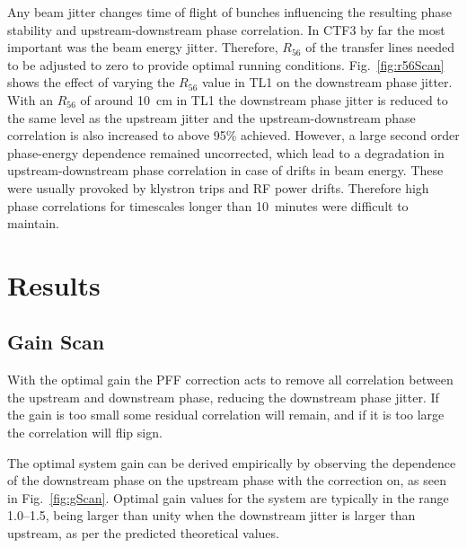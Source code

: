 \documentclass[%
 reprint,
superscriptaddress,
 amsmath,amssymb,
 prl,
]{revtex4-1}
\begin{document}
Any beam jitter changes time of flight of bunches influencing the resulting phase stability
and upstream-downstream phase correlation. In CTF3 by far the most important was the beam energy jitter. 
Therefore, \(R_{56}\) of the transfer lines needed to be adjusted to zero to provide optimal running conditions.
Fig.~\ref{fig:r56Scan} shows the effect of varying the \(R_{56}\) value in TL1 
on the downstream phase jitter. 
With an \(R_{56}\) of around 10~cm in TL1 the downstream phase jitter is 
reduced to the same level as the upstream jitter and
the upstream-downstream phase correlation is also increased to above 95\% achieved.
However, a large second order phase-energy dependence remained uncorrected, 
which lead to a degradation in upstream-downstream phase correlation 
in case of drifts in beam energy. These were usually provoked by klystron trips and RF power drifts. 
Therefore high phase correlations for timescales longer than 10~minutes were difficult to maintain. 

\section{\label{s:results}Results}

\subsection{\label{ss:gScan}Gain Scan}

With the optimal gain the PFF correction acts to remove all correlation between 
the upstream and downstream phase, reducing the downstream phase jitter. If the 
gain is too small some residual correlation will remain, and if it is too large 
the correlation will flip sign. 

The optimal system gain can be derived empirically by observing the dependence 
of the downstream phase on the upstream phase with the correction on, as seen 
in Fig.~\ref{fig:gScan}. Optimal gain values for the system are typically in 
the range 1.0--1.5, being larger than unity when the downstream jitter is 
larger than upstream, as per the predicted theoretical values. 
\end{document}
